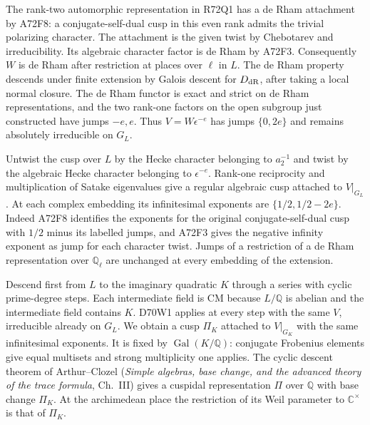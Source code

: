 The rank-two automorphic representation in R72Q1 has a de Rham
attachment by A72F8: a conjugate-self-dual cusp in this even
rank admits the trivial polarizing character. The attachment is
the given twist by Chebotarev and irreducibility. Its algebraic
character factor is de Rham by A72F3. Consequently $W$ is de
Rham after restriction at places over $\ell$ in $L$. The
de Rham property descends under finite extension by Galois
descent for $D_{\rm dR}$, after taking a local normal closure.
The de Rham functor is exact and strict on de Rham representations,
and the two rank-one factors on the open subgroup just constructed
have jumps $-e,e$. Thus $V=W\epsilon^{-e}$ has jumps $\{0,2e\}$
and remains absolutely irreducible on $G_L$.

Untwist the cusp over $L$ by the Hecke character belonging to
$a_2^{-1}$ and twist by the algebraic Hecke character belonging
to $\epsilon^{-e}$. Rank-one reciprocity and multiplication of
Satake eigenvalues give a regular algebraic cusp attached to
$V|_{G_L}$. At each complex embedding its infinitesimal exponents
are $\{1/2,1/2-2e\}$. Indeed A72F8 identifies the exponents for
the original conjugate-self-dual cusp with $1/2$ minus its
labelled jumps, and A72F3 gives the negative infinity exponent
as jump for each character twist. Jumps of a restriction of a
de Rham representation over $\mathbb Q_\ell$ are unchanged at
every embedding of the extension.

Descend first from $L$ to the imaginary quadratic $K$ through
a series with cyclic prime-degree steps. Each intermediate field
is CM because $L/\mathbb Q$ is abelian and the intermediate field
contains $K$. D70W1 applies at every step with the same $V$,
irreducible already on $G_L$. We obtain a cusp $\Pi_K$ attached
to $V|_{G_K}$ with the same infinitesimal exponents. It is fixed
by $\operatorname{Gal}(K/\mathbb Q)$: conjugate Frobenius elements
give equal multisets and strong multiplicity one applies. The
cyclic descent theorem of Arthur--Clozel (\emph{Simple algebras,
base change, and the advanced theory of the trace formula}, Ch.~III) gives a cuspidal representation $\Pi$ over
$\mathbb Q$ with base change $\Pi_K$. At the archimedean place
the restriction of its Weil parameter to $\mathbb C^\times$ is
that of $\Pi_K$.

